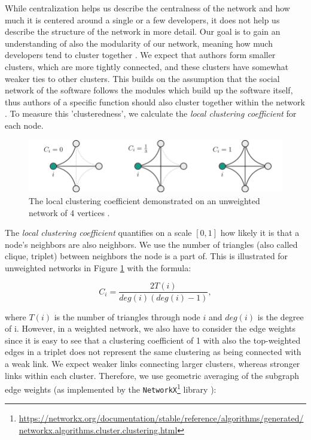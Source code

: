 While centralization helps us describe the centralness of the network and how much it is centered around a single or a few developers, it does not help us describe the structure of the network in more detail. Our goal is to gain an understanding of also the modularity of our network, meaning how much developers tend to cluster together \cite{joblinEvolutionaryTrendsDeveloper2017}. We expect that authors form smaller clusters, which are more tightly connected, and these clusters have somewhat weaker ties to other clusters. This builds on the assumption that the social network of the software follows the modules which build up the software itself, thus authors of a specific function should also cluster together within the network \cite{conwayHowCommitteesInvent1968, joblinEvolutionaryTrendsDeveloper2017}. To measure this 'clusteredness', we calculate the \textit{local clustering coefficient} for each node.

\begin{figure}
    \centering
    \includegraphics[width=1\textwidth]{figures/loc_clust_coeff.png}
    \caption{The local clustering coefficient demonstrated on an unweighted network of 4 vertices \cite{jedrzejewskiRoleComplexNetworks2016}.}
    \label{fig:loc clust coeff}
\end{figure}

The \textit{local clustering coefficient} quantifies on a scale $[0, 1]$ how likely it is that a node's neighbors are also neighbors. We use the number of triangles (also called clique, triplet) between neighbors the node is a part of. This is illustrated for unweighted networks in Figure \ref{fig:loc clust coeff} with the formula:

\[ C_i = \frac{2T(i)}{deg(i)(deg(i)-1)}, \]

where $T(i)$ is the number of triangles through node $i$ and $deg(i)$ is the degree of i. However, in a weighted network, we also have to consider the edge weights since it is easy to see that a clustering coefficient of 1 with also the top-weighted edges in a triplet does not represent the same clustering as being connected with a weak link. We expect weaker links connecting larger clusters, whereas stronger links within each cluster. Therefore, we use geometric averaging of the subgraph edge weights (as implemented by the \texttt{NetworkX}\footnote{\url{https://networkx.org/documentation/stable/reference/algorithms/generated/networkx.algorithms.cluster.clustering.html}} library \cite{onnelaIntensityCoherenceMotifs2005}):

